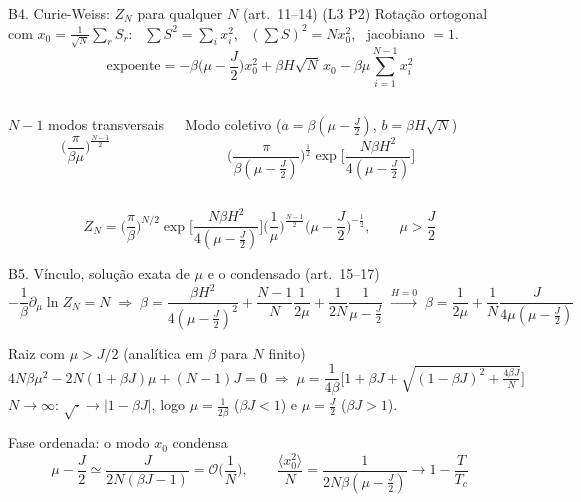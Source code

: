 \documentclass[10pt,aspectratio=169]{beamer}
\newcommand{\lista}[1]{\textcolor{qcdGreen!70!black}{\small(#1)}}
\newcommand{\eq}[1]{\textcolor{qcdBlue!70!black}{\small(#1)}}
\begin{document}
\begin{frame}{B4. Curie-Weiss: $Z_N$ para qualquer $N$ \eq{art.~11--14} \lista{L3 P2}}
  \small
  Rotação ortogonal com $x_0=\frac1{\sqrt N}\sum_rS_r$: \ $\sum S^2=\sum_i x_i^2$, \ $(\sum S)^2=Nx_0^2$, \ jacobiano $=1$.
  \[\text{expoente}=-\beta\Big(\mu-\frac J2\Big)x_0^2+\beta H\sqrt N\,x_0-\beta\mu\sum_{i=1}^{N-1}x_i^2\]
  \begin{columns}[T]
    \begin{block}{$N-1$ modos transversais}
      \[\Big(\frac\pi{\beta\mu}\Big)^{\frac{N-1}2}\]
    \end{block}
    \begin{block}{Modo coletivo ($a=\beta(\mu-\frac J2)$, $b=\beta H\sqrt N$)}
      \[\Big(\frac{\pi}{\beta(\mu-\frac J2)}\Big)^{\frac12}\exp\Big[\frac{N\beta H^2}{4(\mu-\frac J2)}\Big]\]
    \end{block}
  \end{columns}
  \[Z_N=\Big(\frac\pi\beta\Big)^{N/2}\exp\Big[\frac{N\beta H^2}{4(\mu-\frac J2)}\Big]\Big(\frac1\mu\Big)^{\frac{N-1}2}\Big(\mu-\frac J2\Big)^{-\frac12},\qquad\mu>\frac J2\]
\end{frame}

\begin{frame}{B5. Vínculo, solução exata de $\mu$ e o condensado \eq{art.~15--17}}
  \small
  \[-\frac1\beta\partial_\mu\ln Z_N=N\;\Rightarrow\;
    \beta=\frac{\beta H^2}{4(\mu-\frac J2)^2}+\frac{N-1}N\frac1{2\mu}+\frac1{2N}\frac1{\mu-\frac J2}
    \;\xrightarrow{H=0}\;\beta=\frac1{2\mu}+\frac1N\frac{J}{4\mu(\mu-\frac J2)}\]
  \begin{block}{Raiz com $\mu>J/2$ (analítica em $\beta$ para $N$ finito)}
    \[4N\beta\mu^2-2N(1+\beta J)\mu+(N-1)J=0\;\Rightarrow\;
      \mu=\frac1{4\beta}\Big[1+\beta J+\sqrt{(1-\beta J)^2+\tfrac{4\beta J}N}\Big]\]
    $N\to\infty$: $\sqrt{\cdot}\to|1-\beta J|$, logo $\mu=\frac1{2\beta}$ ($\beta J<1$) e $\mu=\frac J2$ ($\beta J>1$).
  \end{block}
  \begin{exampleblock}{Fase ordenada: o modo $x_0$ condensa}
    \[\mu-\frac J2\simeq\frac{J}{2N(\beta J-1)}=\mathcal O\Big(\frac1N\Big),\qquad
      \frac{\langle x_0^2\rangle}N=\frac1{2N\beta(\mu-\frac J2)}\to1-\frac T{T_c}\]
  \end{exampleblock}
\end{frame}
\end{document}
